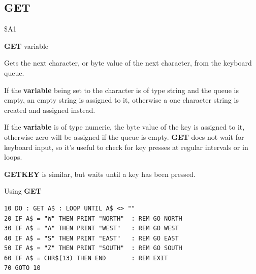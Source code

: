 \subsection{GET}
\begin{description}[leftmargin=2cm,style=nextline]
\item [Token:]    \$A1

\item [Format:]   {\bf GET} variable

\item [Usage:]    Gets the next character, or byte value of the next character, from the keyboard queue.

                  If the {\bf variable} being set to the character is of type string and the queue is empty, an empty string is assigned to it, otherwise a one character string is created and assigned instead.

                  If the {\bf variable} is of type numeric, the byte value of the key is assigned to it, otherwise zero will be assigned if the queue is empty. {\bf GET} does not wait for keyboard input, so it's useful to check for key presses at regular intervals or in loops.

\item [Remarks:]  {\bf GETKEY} is similar, but waits until a key has been pressed.

\item [Example:]  Using {\bf GET}

\begin{tcolorbox}[colback=black,coltext=white]
\verbatimfont{\codefont}
\begin{verbatim}
10 DO : GET A$ : LOOP UNTIL A$ <> ""
20 IF A$ = "W" THEN PRINT "NORTH"  : REM GO NORTH
30 IF A$ = "A" THEN PRINT "WEST"   : REM GO WEST
40 IF A$ = "S" THEN PRINT "EAST"   : REM GO EAST
50 IF A$ = "Z" THEN PRINT "SOUTH"  : REM GO SOUTH
60 IF A$ = CHR$(13) THEN END       : REM EXIT
70 GOTO 10
\end{verbatim}
\end{tcolorbox}
\end{description}


\newpage
